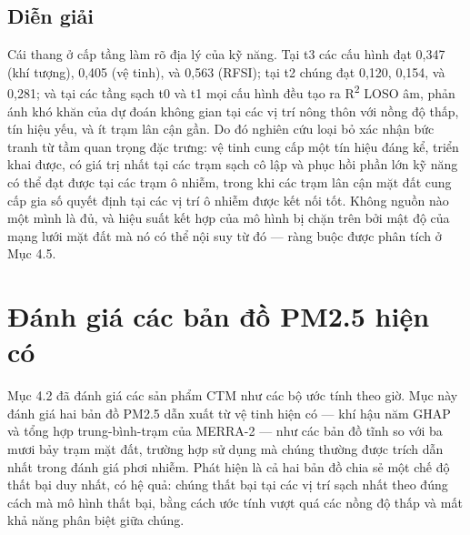 \subsection{Diễn giải}
Cái thang ở cấp tầng làm rõ địa lý của kỹ năng. Tại t3 các cấu hình đạt 0,347 (khí tượng), 0,405 (vệ tinh), và 0,563 (RFSI); tại t2 chúng đạt 0,120, 0,154, và 0,281; và tại các tầng sạch t0 và t1 mọi cấu hình đều tạo ra R\textsuperscript{2} LOSO âm, phản ánh khó khăn của dự đoán không gian tại các vị trí nông thôn với nồng độ thấp, tín hiệu yếu, và ít trạm lân cận gần. Do đó nghiên cứu loại bỏ xác nhận bức tranh từ tầm quan trọng đặc trưng: vệ tinh cung cấp một tín hiệu đáng kể, triển khai được, có giá trị nhất tại các trạm sạch cô lập và phục hồi phần lớn kỹ năng có thể đạt được tại các trạm ô nhiễm, trong khi các trạm lân cận mặt đất cung cấp gia số quyết định tại các vị trí ô nhiễm được kết nối tốt. Không nguồn nào một mình là đủ, và hiệu suất kết hợp của mô hình bị chặn trên bởi mật độ của mạng lưới mặt đất mà nó có thể nội suy từ đó --- ràng buộc được phân tích ở Mục 4.5.
\section{Đánh giá các bản đồ PM2.5 hiện có}
Mục 4.2 đã đánh giá các sản phẩm CTM như các bộ ước tính theo giờ. Mục này đánh giá hai bản đồ PM2.5 dẫn xuất từ vệ tinh hiện có --- khí hậu năm GHAP và tổng hợp trung-bình-trạm của MERRA-2 --- như các bản đồ tĩnh so với ba mươi bảy trạm mặt đất, trường hợp sử dụng mà chúng thường được trích dẫn nhất trong đánh giá phơi nhiễm. Phát hiện là cả hai bản đồ chia sẻ một chế độ thất bại duy nhất, có hệ quả: chúng thất bại tại các vị trí sạch nhất theo đúng cách mà mô hình thất bại, bằng cách ước tính vượt quá các nồng độ thấp và mất khả năng phân biệt giữa chúng.
